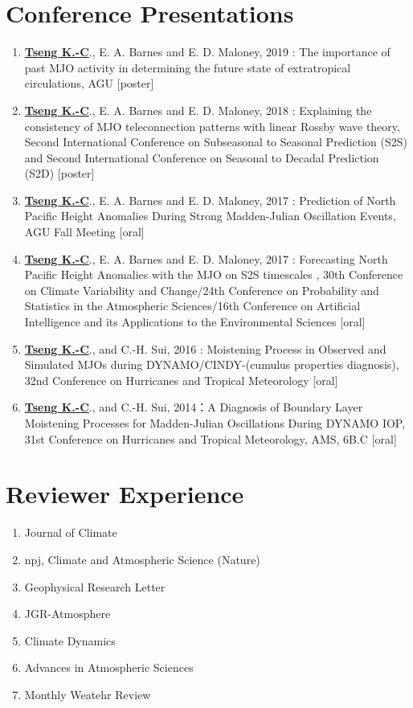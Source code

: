 \documentclass{article}
\begin{document}
\section{\color{airforceblue}Conference Presentations}
\begin{enumerate} 
	\item \normalsize{\bf{\underline{Tseng K.-C}}}., E. A. Barnes and E. D. Maloney, 2019 : The importance of past MJO activity in determining the future state of extratropical circulations, AGU [poster]
	\item \normalsize{\bf{\underline{Tseng K.-C}}}., E. A. Barnes and E. D. Maloney, 2018 : Explaining the consistency of MJO teleconnection patterns with linear Rossby wave theory, Second International Conference on Subseasonal to Seasonal Prediction (S2S) and Second International Conference on Seasonal to Decadal Prediction (S2D) [poster]
	\item \normalsize{\bf{\underline{Tseng K.-C}}}., E. A. Barnes and E. D. Maloney, 2017 : Prediction of North Pacific Height Anomalies During Strong Madden-Julian Oscillation Events, AGU Fall Meeting [oral]
	\item \normalsize{\bf{\underline{Tseng K.-C}}}., E. A. Barnes and E. D. Maloney, 2017 : Forecasting North Pacific Height Anomalies with the MJO on S2S timescales , 30th Conference on Climate Variability and Change/24th Conference on Probability and Statistics in the Atmospheric Sciences/16th Conference on Artificial Intelligence and its Applications to the Environmental Sciences [oral] 
	\item \normalsize{\bf{\underline{Tseng K.-C}}}., and C.-H. Sui, 2016 : Moistening Process in Observed and Simulated MJOs during DYNAMO/CINDY-(cumulus properties diagnosis), 32nd Conference on Hurricanes and Tropical Meteorology [oral] 
	\item \normalsize{\bf{\underline{Tseng K.-C}}}., and C.-H. Sui, 2014：A Diagnosis of Boundary Layer Moistening Processes for Madden-Julian Oscillations During DYNAMO IOP, 31st Conference on Hurricanes and Tropical Meteorology, AMS, 6B.C [oral] 
    \end{enumerate}


\section{\color{airforceblue}Reviewer Experience}
\begin{enumerate}
	\item Journal of Climate 
	\item npj, Climate and Atmospheric Science (Nature)
	\item Geophysical Research Letter
	\item JGR-Atmosphere
	\item Climate Dynamics
	\item Advances in Atmospheric Sciences
	\item Monthly Weatehr Review
\end{enumerate}
\end{document}
